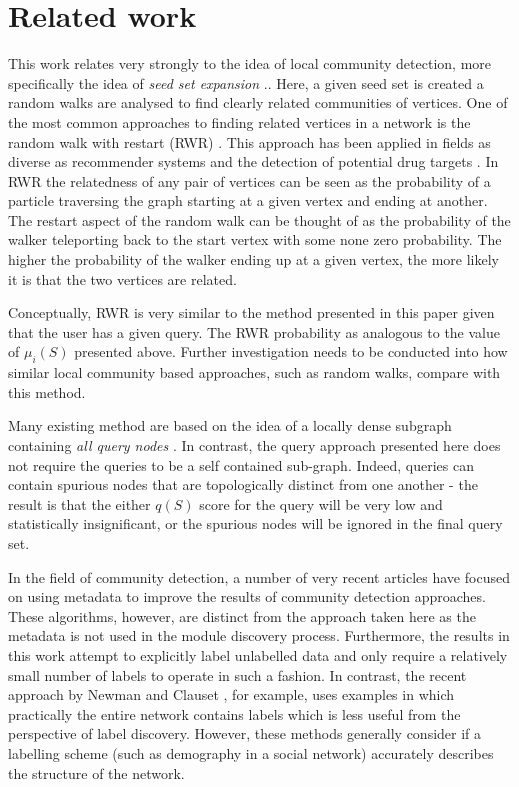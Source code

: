 \documentclass[sigconf]{acmart}
\begin{document}
\section{Related work}
\label{sec:related_work}
This work relates very strongly to the idea of local community detection, more specifically the idea of \textit{seed set expansion} \cite{gleich2012vertex}..
Here, a given seed set is created a random walks are analysed to find clearly related communities of vertices.
One of the most common approaches to finding related vertices in a network is the random walk with restart (RWR) \cite{can2005analysis, kohler2008walking}.
This approach has been applied in fields as diverse as recommender systems and the detection of potential drug targets \cite{chen2012drug}.
In RWR the relatedness of any pair of vertices can be seen as the probability of a particle traversing the graph starting at a given vertex and ending at another.
The restart aspect of the random walk can be thought of as the probability of the walker teleporting back to the start vertex with some none zero probability. 
The higher the probability of the walker ending up at a given vertex, the more likely it is that the two vertices are related.

Conceptually, RWR is very similar to the method presented in this paper given that the user has a given query.
The RWR probability as analogous to the value of $\mu_i(S)$ presented above.
Further investigation needs to be conducted into how similar local community based approaches, such as random walks, compare with this method.

Many existing method are based on the idea of a locally dense subgraph containing \textit{all query nodes} \cite{benson2016higher}.
In contrast, the query approach presented here does not require the queries to be a self contained sub-graph.
Indeed, queries can contain spurious nodes that are topologically distinct from one another - the result is that the either $q(S)$ score for the query will be very low and statistically insignificant, or the spurious nodes will be ignored in the final query set.

In the field of community detection, a number of very recent articles have focused on using metadata to improve the results of community detection approaches.
These algorithms, however, are distinct from the approach taken here as the metadata is not used in the module discovery process.
Furthermore, the results in this work attempt to explicitly label unlabelled data and only require a relatively small number of labels to operate in such a fashion.
In contrast,  the recent approach by Newman and Clauset \cite{newman2016structure}, for example, uses examples in which practically the entire network contains labels which is less useful from the perspective of label discovery.
However, these methods generally consider if a labelling scheme (such as demography in a social network) accurately describes the structure of the network. 
\end{document}
